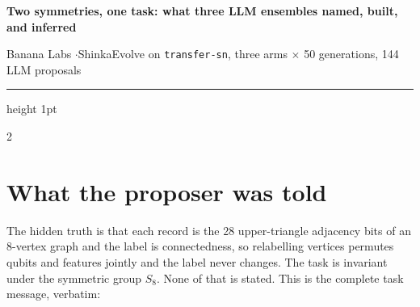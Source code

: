 \documentclass[10pt]{article}
\begin{document}
{\LARGE\bfseries Two symmetries, one task: what three LLM ensembles named, built, and inferred}\\[2pt]
{\color{inkc}\normalsize Banana Labs \quad$\cdot$\quad ShinkaEvolve on \texttt{transfer-sn},
three arms $\times$ 50 generations, 144 LLM proposals\par}
\vspace{4pt}
{\color{rulec}\hrule height 1pt}
\vspace{6pt}

\begin{multicols}{2}
\small

\section*{What the proposer was told}

The hidden truth is that each record is the 28 upper-triangle adjacency bits of an
8-vertex graph and the label is connectedness, so relabelling vertices permutes
qubits and features jointly and the label never changes. The task is invariant
under the symmetric group $S_8$. None of that is stated. This is the complete task
message, verbatim:


\end{multicols}
\end{document}
